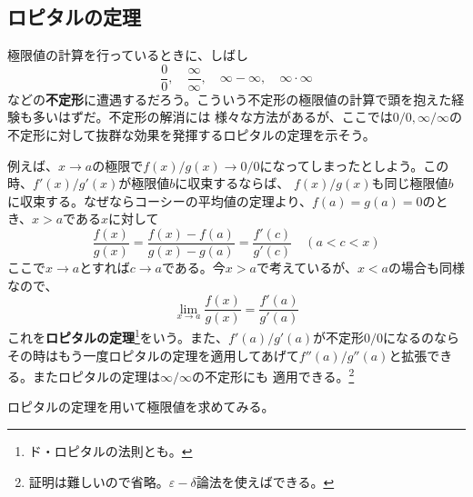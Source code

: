\documentclass[a4j,dvipdfmx]{jsarticle}
\begin{document}
                \clearpage
                \subsection{ロピタルの定理}
                    極限値の計算を行っているときに、しばし
                    \begin{equation*}
                        \frac{0}{0},\quad\frac{\infty}{\infty},\quad\infty -\infty,\quad\infty\cdot\infty
                    \end{equation*}
                    などの\textbf{不定形}に遭遇するだろう。こういう不定形の極限値の計算で頭を抱えた経験も多いはずだ。不定形の解消には
                    様々な方法があるが、ここでは$0/0,\infty/\infty$の不定形に対して抜群な効果を発揮するロピタルの定理を示そう。
                    
                    例えば、$x\to a$の極限で$f(x)/g(x)\to 0/0$になってしまったとしよう。この時、$f'(x)/g'(x)$が極限値$b$に収束するならば、
                    $f(x)/g(x)$も同じ極限値$b$に収束する。なぜならコーシーの平均値の定理より、$f(a)=g(a)=0$のとき、$x>a$である$x$に対して
                    \begin{equation*}
                        \frac{f(x)}{g(x)}=\frac{f(x)-f(a)}{g(x)-g(a)}=\frac{f'(c)}{g'(c)}\quad(a<c<x)
                    \end{equation*}
                    ここで$x\to a$とすれば$c\to a$である。今$x>a$で考えているが、$x<a$の場合も同様なので、
                    \begin{equation}
                        \lim_{x\to a}\frac{f(x)}{g(x)}=\frac{f'(a)}{g'(a)}\label{ロピタルの定理}
                    \end{equation}
                    これを\textbf{ロピタルの定理}\footnote{ド・ロピタルの法則とも。}をいう。また、$f'(a)/g'(a)$が不定形$0/0$になるのなら
                    その時はもう一度ロピタルの定理を適用してあげて$f''(a)/g''(a)$と拡張できる。またロピタルの定理は$\infty/\infty$の不定形にも
                    適用できる。\footnote{証明は難しいので省略。$\varepsilon-\delta$論法を使えばできる。}

                    ロピタルの定理を用いて極限値を求めてみる。
\end{document}
